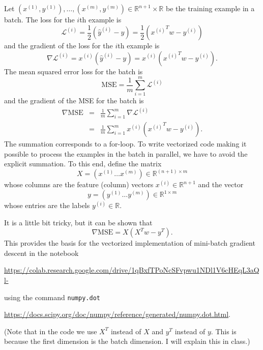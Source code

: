 \documentclass[12pt]{article}
\newcommand{\R}{\mathbb{R}}
\begin{document}
Let $(x^{(1)},y^{(1)}), \ldots, (x^{(m)},y^{(m)})\in \R^{n+1}\times \R$ be the training example in a batch.  
The loss for the $i$th example is
\begin{equation}
\mathcal{L}^{(i)} = \frac{1}{2}(\hat{y}^{(i)} - y) = \frac{1}{2}({x^{(i)}}^T w - y^{(i)})
\end{equation}
and the gradient of the loss for the $i$th example is
\begin{equation}
\nabla \mathcal{L}^{(i)} =  x^{(i)} (\hat{y}^{(i)} - y) = x^{(i)} ({x^{(i)}}^T w - y^{(i)}).
\end{equation}
The mean squared error loss for the batch is
\begin{equation}
\mathrm{MSE} = \frac{1}{m} \sum_{i=1}^m \mathcal{L}^{(i)}
\end{equation}
and the gradient of the MSE for the batch is
\begin{eqnarray}
\nabla \mathrm{MSE} 
&=& 
\frac{1}{m} \sum_{i=1}^m \nabla \mathcal{L}^{(i)} \\
&=& 
\frac{1}{m} \sum_{i=1}^m x^{(i)} ({x^{(i)}}^T w - y^{(i)}).
\end{eqnarray}
The summation corresponds to a for-loop.  To write vectorized code making it possible to process the examples in the batch in parallel, we have to avoid the explicit summation. 
To this end, define the matrix 
\begin{equation}
X = (x^{(1)} \ldots x^{(m)})\in\R^{(n+1) \times m}
\end{equation}
whose columns are the feature (column) vectors $x^{(i)}\in\R^{n+1}$ and the vector
\begin{equation}
y = (y^{(1)} \ldots y^{(m)})\in\R^{1\times m}
\end{equation}
whose entries are the labels $y^{(i)}\in \R$.

It is a little bit tricky, but it can be shown that
\begin{equation}
\nabla \mathrm{MSE} = X (X^T w - y^T).
\end{equation}
This provides the basis for the vectorized implementation of mini-batch gradient descent in the notebook

\noindent
{\footnotesize \url{https://colab.research.google.com/drive/1qBxfTPoNcSFvpwu1NDl1V6cHEqL3aQl-}}

\noindent
using the command \texttt{numpy.dot} 

\noindent
{\footnotesize \url{https://docs.scipy.org/doc/numpy/reference/generated/numpy.dot.html}}.

\noindent
(Note that in the code we use $X^T$ instead of $X$ and $y^T$ instead of $y$. This is because the first dimension is the batch dimension. I will explain this in class.)
\end{document}
